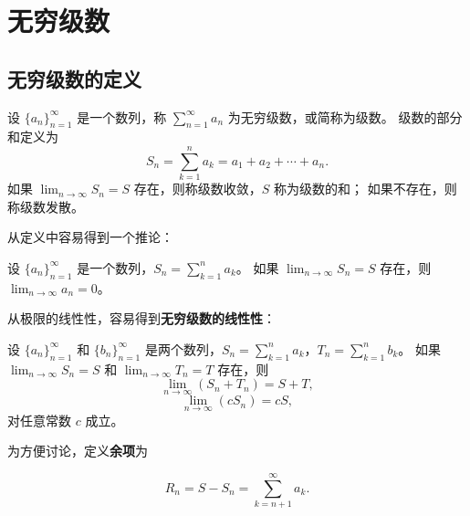 \section{无穷级数}\label{sec:infinite-series}

\subsection{无穷级数的定义}\label{subsec:infinite-series-definition}

\begin{definition}[无穷级数的定义]
  设 $\{a_n\}_{n=1}^{\infty}$ 是一个数列，称 $\sum_{n=1}^{\infty} a_n$ 为无穷级数，或简称为级数。
  级数的部分和定义为
  \begin{equation*}
    S_n = \sum_{k=1}^{n} a_k = a_1 + a_2 + \cdots + a_n.
  \end{equation*}
  如果 $\lim_{n \to \infty} S_n = S$ 存在，则称级数收敛，$S$ 称为级数的和；
  如果不存在，则称级数发散。
\end{definition}

从定义中容易得到一个推论：

\begin{lemma}\label{lem:infinite-series-convergence}
  设 $\{a_n\}_{n=1}^{\infty}$ 是一个数列，$S_n = \sum_{k=1}^{n} a_k$。
  如果 $\lim_{n \to \infty} S_n = S$ 存在，则 $\lim_{n \to \infty} a_n = 0$。
\end{lemma}

从极限的线性性，容易得到\textbf{无穷级数的线性性}：

\begin{property}[无穷级数的线性性]\label{prop:infinite-series-linearity}
  设 $\{a_n\}_{n=1}^{\infty}$ 和 $\{b_n\}_{n=1}^{\infty}$ 是两个数列，$S_n = \sum_{k=1}^{n} a_k$，$T_n = \sum_{k=1}^{n} b_k$。
  如果 $\lim_{n \to \infty} S_n = S$ 和 $\lim_{n \to \infty} T_n = T$ 存在，则
  \begin{equation*}
    \lim_{n \to \infty} (S_n + T_n) = S + T,
  \end{equation*}
  \begin{equation*}
    \lim_{n \to \infty} (c S_n) = c S,
  \end{equation*}
  对任意常数 $c$ 成立。
\end{property}

为方便讨论，定义\textbf{余项}为

\begin{equation*}
  R_n = S - S_n = \sum_{k=n+1}^{\infty} a_k.
\end{equation*}

